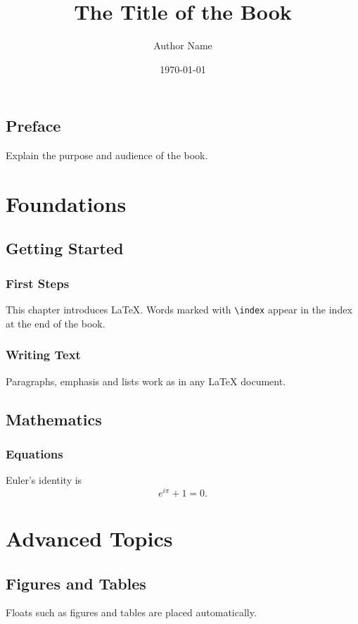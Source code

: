 \documentclass[11pt,a4paper]{book}
\title{\Huge\bfseries The Title of the Book}
\author{Author Name}
\date{\today}
\begin{document}
\frontmatter
\maketitle
\tableofcontents

\chapter{Preface}
Explain the purpose and audience of the book.

\mainmatter

\part{Foundations}

\chapter{Getting Started}
\section{First Steps}
This chapter introduces \LaTeX{}. Words marked with \verb|\index| appear in the index at the end of the book.

\section{Writing Text}
Paragraphs, emphasis and lists work as in any \LaTeX{} document.

\chapter{Mathematics}
\section{Equations}
Euler's identity is
\begin{equation}
  e^{i\pi} + 1 = 0.
\end{equation}

\part{Advanced Topics}

\chapter{Figures and Tables}
Floats such as figures and tables are placed automatically.

\backmatter
\printindex
\end{document}
